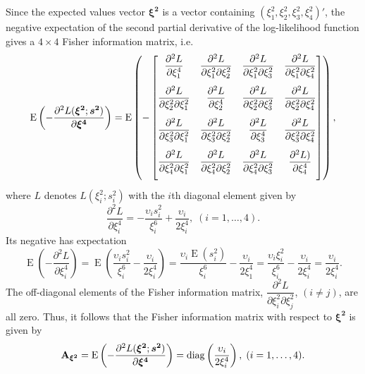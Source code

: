 Since the expected values vector $\bm{\xi^2}$ is a vector containing $(\xi_1^2, \xi_2^2,\xi_3^2,\xi_4^2)'$, the negative expectation of the second partial derivative of the log-likelihood function gives a $4 \times 4$ Fisher information matrix, i.e.\
\[  \operatorname{E} \left(-\dfrac{\partial^2 L(\bm{\xi^2};\bm{s^2})}{\partial \bm{\xi^4}}\right) =  \operatorname{E}\left( -
\begin{bmatrix}            
\vspace{8pt} \dfrac{\partial^2 L}{\partial \xi_1^4} &  \dfrac{\partial^2 L}{\partial \xi_1^2\partial \xi_2^2} &  \dfrac{\partial^2 L}{\partial \xi_1^2\partial \xi_3^2} & \dfrac{\partial^2 L}{\partial \xi_1^2\partial \xi_4^2}  \\ 
\vspace{8pt} \dfrac{\partial^2 L}{\partial \xi_2^2\partial \xi_1^2} & \dfrac{\partial^2 L}{\partial \xi_2^4} &  \dfrac{\partial^2 L}{\partial \xi_2^2\partial \xi_3^2} & \dfrac{\partial^2 L}{\partial \xi_2^2\partial \xi_4^2} \\
\vspace{8pt} \dfrac{\partial^2 L}{\partial \xi_3^2\partial \xi_1^2} &  \dfrac{\partial^2 L}{\partial \xi_3^2\partial \xi_2^2} & \dfrac{\partial^2 L}{\partial \xi_3^4} &  \dfrac{\partial^2 L}{\partial \xi_3^2\partial \xi_4^2}  \\
\vspace{8pt} \dfrac{\partial^2 L}{\partial \xi_4^2\partial \xi_1^2} & \dfrac{\partial^2 L}{\partial \xi_4^2\partial \xi_2^2} &  \dfrac{\partial^2 L}{\partial \xi_4^2\partial \xi_3^2} & \dfrac{\partial^2 L)}{\partial \xi_4^4} \\
\end{bmatrix}
\right),  \] 
where $L$ denotes $L(\xi_i^2;s_i^2)$ with the $i$th diagonal element given by
\[\dfrac{\partial^2 L}{\partial \xi_i^4} = -\dfrac{\upsilon_i s_i^2 }{\xi_i^6} + \dfrac{\upsilon_i }{2\xi_i^4},\; ( i = 1, \dots, 4). \]
Its negative has expectation
\[ \operatorname{E} \left( -\dfrac{\partial^2 L}{\partial \xi_i^4} \right) = \operatorname{E} \left(\dfrac{\upsilon_i s_i^2 }{\xi_i^6} - \dfrac{\upsilon_i }{2\xi_i^4}\right) = \dfrac{\upsilon_i  \operatorname{E}(s_i^2) }{\xi_i^6} - \dfrac{\upsilon_i }{2\xi_1^4} =  \dfrac{\upsilon_i  \xi_i^2 }{\xi_i^6} - \dfrac{\upsilon_i }{2\xi_i^4} =  \dfrac{\upsilon_i }{2\xi_i^4}.\] 
The off-diagonal elements of the Fisher information matrix, $\dfrac{\partial^2 L}{\partial \xi_i^2\partial \xi_j^2}$, $(i \neq j)$, are all zero. Thus, it follows that the Fisher information matrix with respect to $\bm{\xi^2}$ is given by 
\begin{equation}\label{eq:fishInfoOld}
\mathbf{A}_{\bm{\xi^2}} =  \operatorname{E} \left(-\dfrac{\partial^2 L(\bm{\xi^2};\bm{s^2})}{\partial \bm{\xi^4}}\right) = \mathrm{diag} \left( \dfrac{\upsilon_i }{2\xi_i^4}\right),\; (i = 1, \dots, 4).
\end{equation}


